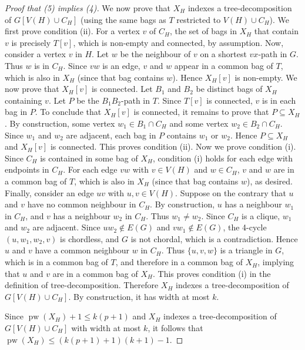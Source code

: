 \documentclass[a4paper,11pt]{article}
\DeclareMathOperator{\pw}{pw}
\theoremstyle{plain}
\theoremstyle{definition}
\begin{document}
\begin{proof}[Proof that (5) implies (4)]
We now prove that $X_H$ indexes a tree-decomposition of $G[V(H)\cup C_H]$ (using the same bags as $T$ restricted to $V(H)\cup C_H$). We first prove condition (ii). For a vertex $v$ of $C_H$, the set of bags in $X_H$ that contain $v$ is precisely $T[v]$, which is non-empty and connected, by assumption. Now, consider a vertex $v$ in $H$. Let $w$ be the neighbour of $v$ on a shortest $vx$-path in $G$. Thus $w$ is in $C_H$. Since $vw$ is an edge,  $v$ and $w$ appear in a common bag of $T$, which is also in $X_H$ (since that bag contains $w$). Hence $X_H[v]$ is non-empty. 
We now prove that  $X_H[v]$ is connected. Let $B_1$ and $B_2$ be distinct bags of $X_H$ containing $v$. Let $P$ be the $B_1B_2$-path in $T$. Since $T[v]$ is connected, $v$ is in each bag in $P$. To conclude that $X_H[v]$ is connected, it remains to prove that $P\subseteq X_H$. By construction, some vertex $w_1\in B_1\cap C_H$ and some vertex $w_2\in B_2\cap C_H$. Since $w_1$ and $w_2$ are adjacent, each bag in $P$ contains $w_1$ or $w_2$. Hence $P\subseteq X_H$ and $X_H[v]$ is connected. This proves condition (ii). Now we prove condition (i). Since $C_H$ is contained in some bag of $X_H$, condition (i) holds for each edge with endpoints in $C_H$. For each edge $vw$ with $v\in V(H)$ and $w\in C_H$,  $v$ and $w$ are in a common bag of $T$, which is also in $X_H$ (since that bag contains $w$), as desired. Finally, consider an edge $uv$ with $u,v\in V(H)$. Suppose on the contrary that $u$ and $v$ have no common neighbour in $C_H$. By construction,  $u$ has a neighbour $w_1$ in $C_H$, and $v$ has a neighbour $w_2$ in $C_H$. Thus $w_1\neq w_2$. Since $C_H$ is a clique, $w_1$ and $w_2$ are adjacent. Since $uw_2\not\in E(G)$ and $vw_1\not\in E(G)$, the 4-cycle $(u,w_1,w_2,v)$ is chordless, and $G$ is not chordal, which is a contradiction. Hence $u$ and $v$ have a common neighbour $w$ in $C_H$. Thus $\{u,v,w\}$ is a triangle in $G$, which is in a common bag of $T$, and therefore in a common bag of $X_H$, implying that $u$ and $v$ are in a common bag of $X_H$. This proves  condition (i) in the definition of tree-decomposition. Therefore $X_H$ indexes a tree-decomposition of $G[V(H)\cup C_H]$. By construction, it has width at most $k$. 

Since $\pw(X_H)+1\leq k(p+1)$ and $X_H$ indexes a tree-decomposition of $G[V(H)\cup C_H]$ with width at most $k$, it follows that  $\pw(X_H) \leq (k(p+1)+1)(k+1)-1$.  


\end{proof}
\end{document}
